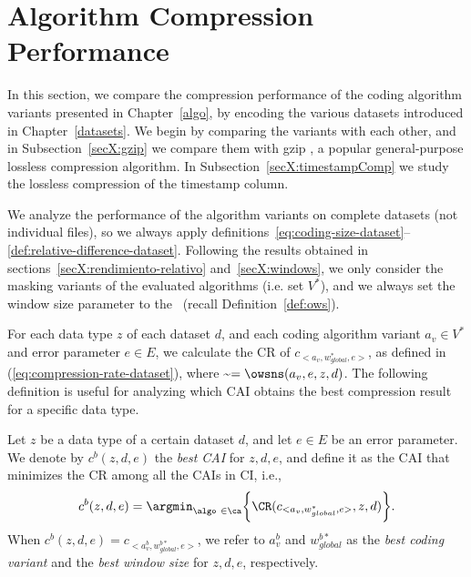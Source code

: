 
\section{Algorithm Compression Performance}
\label{secX:codersmask}


In this section, we compare the compression performance of the coding algorithm variants presented in Chapter~\ref{algo}, by encoding the various datasets introduced in Chapter~\ref{datasets}. We begin by comparing the variants with each other, and in Subsection~\ref{secX:gzip} we compare them with gzip \cite{gzip}, a popular general-purpose lossless compression algorithm. In Subsection~\ref{secX:timestampComp} we study the lossless compression of the timestamp column. 


We analyze the performance of the algorithm variants on complete datasets (not individual files), so we always apply definitions~\ref{eq:coding-size-dataset}--\ref{def:relative-difference-dataset}. Following the results obtained in sections~\ref{secX:rendimiento-relativo} and~\ref{secX:windows}, we only consider the masking variants of the evaluated algorithms (i.e. set $V^{*}$), and we always set the window size parameter to the \owsns\ (recall Definition~\ref{def:ows}).


For each data type $z$ of each dataset $d$, and each coding algorithm variant $a_v \in V^{*}$ and error parameter $e \in E$, we calculate the CR of $c_{<a_v, w_{global}^{*}, e>}$, as defined in (\ref{eq:compression-rate-dataset}), where \WGlobal\~$=\owsns(a_v, e, z, d)$. The following definition is useful for analyzing which CAI obtains the best compression result for a specific data type.


\newcommand{\tasaCompTwo}{\CR(c_{<a_v, w_{global}^{*}, e>}, z, d)}
\begin{defcion}
\label{def:bestcai}
Let $z$ be a data type of a certain dataset $d$, and let $e \in E$ be an error parameter. We denote by $c^{b}(z, d, e)$ the \textit{best CAI} for $z, d, e$, and define it as the CAI that minimizes the CR among all the CAIs in CI, i.e.,
\vspace{-3pt}
\begin{equation}
\label{eq:eqbestcai}
c^{b}(z, d, e) = \argmin_{\algo \ \in \ca} \biggl\{ \tasaCompTwo \biggr\}.
\end{equation}
When $c^{b}(z, d, e) = c_{<a^{b}_v, w_{global}^{b*}, e>}$, we refer to $a^{b}_v$ and $w_{global}^{b*}$ as the \textit{best coding variant} and the \textit{best window size} for $z, d, e$, respectively.
\end{defcion}


